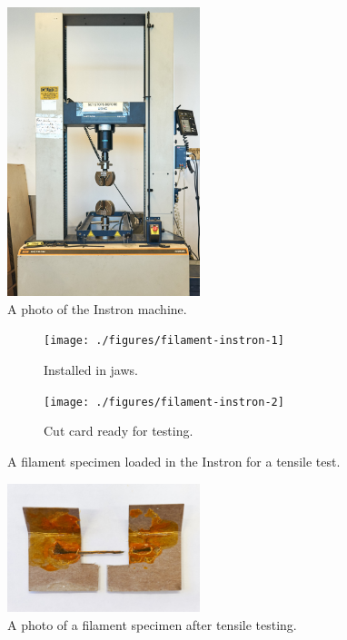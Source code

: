 \begin{figure}[h!]
    \centering
    \includegraphics[width=0.5\textwidth]{./figures/intstron-overview}
    \caption{A photo of the Instron machine.}
    \label{fig:intstron-overview}
\end{figure}

\begin{figure}[h!]
        \centering
        \begin{subfigure}[b]{0.3\textwidth}
                \texttt{[image: ./figures/filament-instron-1]}
                \caption{Installed in jaws.}
                \label{fig:filament-instron-1}
        \end{subfigure}
        \begin{subfigure}[b]{0.3\textwidth}
                \texttt{[image: ./figures/filament-instron-2]}
                \caption{Cut card ready for testing.}
                \label{fig:filament-instron-2}
        \end{subfigure}
        \caption{A filament specimen loaded in the Instron for a tensile test.}\label{fig:instron-setup}
\end{figure}

\begin{figure}[h!]
    \centering
    \includegraphics[width=0.5\textwidth]{./figures/filament-card-after-instron}
    \caption{A photo of a filament specimen after tensile testing.}
    \label{fig:filament-card-after-instron}
\end{figure}

